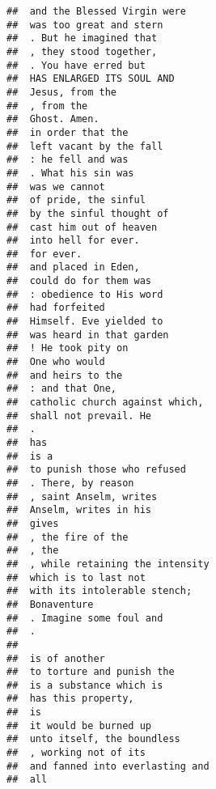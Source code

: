 \documentclass[]{article}
\begin{document}
\begin{verbatim}
##  and the Blessed Virgin were             
##  was too great and stern                 
##  . But he imagined that                  
##  , they stood together,                  
##  . You have erred but                    
##  HAS ENLARGED ITS SOUL AND               
##  Jesus, from the                         
##  , from the                              
##  Ghost. Amen.                            
##  in order that the                       
##  left vacant by the fall                 
##  : he fell and was                       
##  . What his sin was                      
##  was we cannot                           
##  of pride, the sinful                    
##  by the sinful thought of                
##  cast him out of heaven                  
##  into hell for ever.                     
##  for ever.                               
##  and placed in Eden,                     
##  could do for them was                   
##  : obedience to His word                 
##  had forfeited                           
##  Himself. Eve yielded to                 
##  was heard in that garden                
##  ! He took pity on                       
##  One who would                           
##  and heirs to the                        
##  : and that One,                         
##  catholic church against which,          
##  shall not prevail. He                   
##  .                                       
##  has                                     
##  is a                                    
##  to punish those who refused             
##  . There, by reason                      
##  , saint Anselm, writes                  
##  Anselm, writes in his                   
##  gives                                   
##  , the fire of the                       
##  , the                                   
##  , while retaining the intensity         
##  which is to last not                    
##  with its intolerable stench;            
##  Bonaventure                             
##  . Imagine some foul and                 
##  .                                       
##                                          
##  is of another                           
##  to torture and punish the               
##  is a substance which is                 
##  has this property,                      
##  is                                      
##  it would be burned up                   
##  unto itself, the boundless              
##  , working not of its                    
##  and fanned into everlasting and         
##  all                                     

\end{verbatim}
\end{document}
